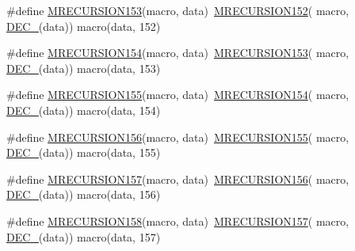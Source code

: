 \begin{DoxyCompactItemize}
\item 
\#define \mbox{\hyperlink{group__group__sam0__utils__mrecursion_gaa4af965a0bd2fa1bb023f774cbf18132}{M\+R\+E\+C\+U\+R\+S\+I\+O\+N153}}(macro,  data)~\mbox{\hyperlink{group__group__sam0__utils__mrecursion_ga06ffc91df193dcdab63b568718773b02}{M\+R\+E\+C\+U\+R\+S\+I\+O\+N152}}(  macro, \mbox{\hyperlink{group__group__sam0__utils__mrecursion_ga1d23d683797679dca8c3512a54a5dcae}{D\+E\+C\+\_\+}}(data))   macro(data, 152)
\item 
\#define \mbox{\hyperlink{group__group__sam0__utils__mrecursion_ga1d5ab6221edda6ab4d5438c93ffc9389}{M\+R\+E\+C\+U\+R\+S\+I\+O\+N154}}(macro,  data)~\mbox{\hyperlink{group__group__sam0__utils__mrecursion_gaa4af965a0bd2fa1bb023f774cbf18132}{M\+R\+E\+C\+U\+R\+S\+I\+O\+N153}}(  macro, \mbox{\hyperlink{group__group__sam0__utils__mrecursion_ga1d23d683797679dca8c3512a54a5dcae}{D\+E\+C\+\_\+}}(data))   macro(data, 153)
\item 
\#define \mbox{\hyperlink{group__group__sam0__utils__mrecursion_gae7fdd694998d7f45d73f51305b8d8f1f}{M\+R\+E\+C\+U\+R\+S\+I\+O\+N155}}(macro,  data)~\mbox{\hyperlink{group__group__sam0__utils__mrecursion_ga1d5ab6221edda6ab4d5438c93ffc9389}{M\+R\+E\+C\+U\+R\+S\+I\+O\+N154}}(  macro, \mbox{\hyperlink{group__group__sam0__utils__mrecursion_ga1d23d683797679dca8c3512a54a5dcae}{D\+E\+C\+\_\+}}(data))   macro(data, 154)
\item 
\#define \mbox{\hyperlink{group__group__sam0__utils__mrecursion_ga87de4a3978fb584862694e65f870c5d2}{M\+R\+E\+C\+U\+R\+S\+I\+O\+N156}}(macro,  data)~\mbox{\hyperlink{group__group__sam0__utils__mrecursion_gae7fdd694998d7f45d73f51305b8d8f1f}{M\+R\+E\+C\+U\+R\+S\+I\+O\+N155}}(  macro, \mbox{\hyperlink{group__group__sam0__utils__mrecursion_ga1d23d683797679dca8c3512a54a5dcae}{D\+E\+C\+\_\+}}(data))   macro(data, 155)
\item 
\#define \mbox{\hyperlink{group__group__sam0__utils__mrecursion_ga481d40dbd33826b73a0e2920a726c0f8}{M\+R\+E\+C\+U\+R\+S\+I\+O\+N157}}(macro,  data)~\mbox{\hyperlink{group__group__sam0__utils__mrecursion_ga87de4a3978fb584862694e65f870c5d2}{M\+R\+E\+C\+U\+R\+S\+I\+O\+N156}}(  macro, \mbox{\hyperlink{group__group__sam0__utils__mrecursion_ga1d23d683797679dca8c3512a54a5dcae}{D\+E\+C\+\_\+}}(data))   macro(data, 156)
\item 
\#define \mbox{\hyperlink{group__group__sam0__utils__mrecursion_ga90de60faf1fb23d6aa01aaccbe3b4e79}{M\+R\+E\+C\+U\+R\+S\+I\+O\+N158}}(macro,  data)~\mbox{\hyperlink{group__group__sam0__utils__mrecursion_ga481d40dbd33826b73a0e2920a726c0f8}{M\+R\+E\+C\+U\+R\+S\+I\+O\+N157}}(  macro, \mbox{\hyperlink{group__group__sam0__utils__mrecursion_ga1d23d683797679dca8c3512a54a5dcae}{D\+E\+C\+\_\+}}(data))   macro(data, 157)

\end{DoxyCompactItemize}
